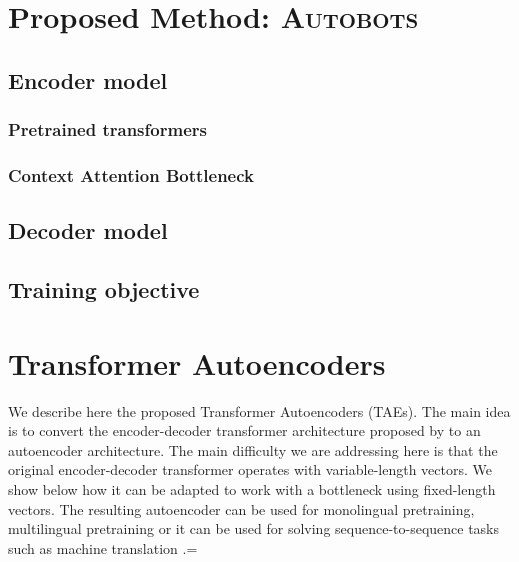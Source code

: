 

\section{Proposed Method: \textsc{Autobots}}

\subsection{Encoder model}

\subsubsection{Pretrained transformers} 

\subsubsection{Context Attention Bottleneck} 

\subsection{Decoder model}

\subsection{Training objective}




\section{Transformer Autoencoders}
We describe here the proposed Transformer Autoencoders (TAEs). The main idea is to convert the encoder-decoder transformer architecture proposed by \citet{vaswani17} to an autoencoder architecture. The main difficulty we are addressing here is that the original encoder-decoder transformer operates with variable-length vectors. We show below how it can be adapted to work with a bottleneck using fixed-length vectors. The resulting autoencoder can be used for monolingual \cite{devlin-etal-2019-bert} pretraining, multilingual pretraining \cite{artetxe18} or it can be used for solving sequence-to-sequence tasks such as machine translation \citep{vaswani17}.=

